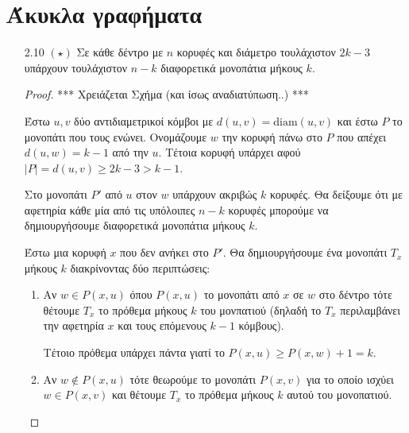\documentclass[a4paper, oneside, 11pt]{article}
\theoremstyle{definition}
\begin{document}
\section{Άκυκλα γραφήματα}

\begin{enumerate}
   \item[2.10 $(\star)$]
      Σε κάθε δέντρο με $n$ κορυφές και διάμετρο τουλάχιστον
      $2k - 3$ υπάρχουν τουλάχιστον $n-k$ διαφορετικά μονοπάτια
      μήκους $k$.

      \begin{proof}

      *** Χρειάζεται Σχήμα (και ίσως αναδιατύπωση..) ***

      Έστω $u, v$ δύο αντιδιαμετρικοί κόμβοι με $d(u, v) = \text{diam}(u, v)$
      και έστω $P$ το μονοπάτι που τους ενώνει.
      Ονομάζουμε $w$ την κορυφή πάνω στο $P$ που απέχει $d(u, w) = k-1$
      από την $u$. Τέτοια κορυφή υπάρχει αφού $|P| = d(u, v) \geq 2k-3 > k-1$.


      
      Στο μονοπάτι $P'$ από $u$ στον $w$ υπάρχουν ακριβώς $k$ κορυφές.
      Θα δείξουμε ότι με αφετηρία κάθε μία από τις υπόλοιπες $n-k$ κορυφές
      μπορούμε να δημιουργήσουμε διαφορετικά μονοπάτια μήκους $k$.

      Έστω μια κορυφή $x$ που δεν ανήκει στο $P'$. Θα δημιουργήσουμε ένα
      μονοπάτι $T_x$ μήκους $k$ διακρίνοντας δύο περιπτώσεις:

      \begin{enumerate}
         \item Αν $w \in P(x, u)$ όπου $P(x, u)$ το μονοπάτι από $x$ σε
               $w$ στο δέντρο τότε θέτουμε $T_x$ το πρόθεμα μήκους $k$ του
               μονπατιού (δηλαδή το $T_x$ περιλαμβάνει την αφετηρία $x$ και
               τους επόμενους $k-1$ κόμβους).

               Τέτοιο πρόθεμα υπάρχει πάντα γιατί το $P(x, u) \geq
               P(x, w) + 1 = k$.

         \item Αν $w \notin P(x, u)$ τότε θεωρούμε το μονοπάτι $P(x, v)$
               για το οποίο ισχύει $w \in P(x, v)$ και θέτουμε $T_x$ το
               πρόθεμα μήκους $k$ αυτού του μονοπατιού.


\end{enumerate}
\end{proof}
\end{enumerate}
\end{document}
